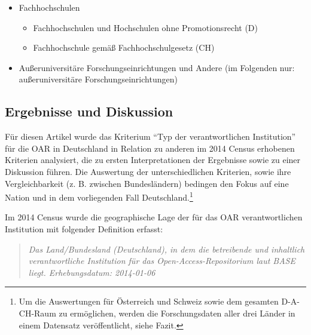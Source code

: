 \documentclass[a4paper,
fontsize=11pt,
oneside,
numbers=noperiodatend,
parskip=half-,
bibliography=totoc,
final
]{scrartcl}
\begin{document}
\begin{itemize}
\item
  Fachhochschulen

  \begin{itemize}
  \item
    Fachhochschulen und Hochschulen ohne Promotionsrecht (D)
  \item
    Fachhochschule gemäß Fachhochschulgesetz (CH)
  \end{itemize}
\item
  Außeruniversitäre Forschungseinrichtungen und Andere (im Folgenden
  nur: außeruniversitäre Forschungseinrichtungen)
\end{itemize}

\subsection*{Ergebnisse und
Diskussion}\label{ergebnisse-und-diskussion}

Für diesen Artikel wurde das Kriterium \enquote{Typ der verantwortlichen
Institution} für die OAR in Deutschland in Relation zu anderen im 2014
Census erhobenen Kriterien analysiert, die zu ersten Interpretationen
der Ergebnisse sowie zu einer Diskussion führen. Die Auswertung der
unterschiedlichen Kriterien, sowie ihre Vergleichbarkeit (z. B. zwischen
Bundesländern) bedingen den Fokus auf eine Nation und in dem
vorliegenden Fall Deutschland.\footnote{Um die Auswertungen für
  Österreich und Schweiz sowie dem gesamten D-A-CH-Raum zu ermöglichen,
  werden die Forschungsdaten aller drei Länder in einem Datensatz
  veröffentlicht, siehe Fazit.}


Im 2014 Census wurde die geographische Lage der für das OAR
verantwortlichen Institution mit folgender Definition erfasst:

\begin{quote}
\emph{Das Land/Bundesland (Deutschland), in dem die betreibende und
inhaltlich verantwortliche Institution für das Open-Access-Repositorium
laut BASE liegt. Erhebungsdatum: 2014-01-06}
\end{quote}
\end{document}
